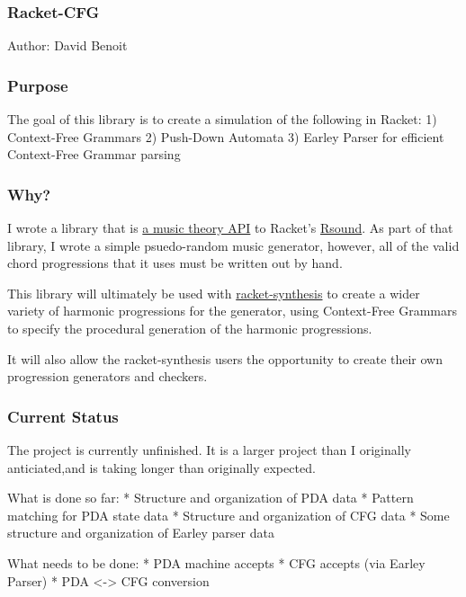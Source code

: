 \subsubsection{Racket-CFG}\label{racket-cfg}

Author: David Benoit

\subsubsection{Purpose}\label{purpose}

The goal of this library is to create a simulation of the following in
Racket: 1) Context-Free Grammars 2) Push-Down Automata 3) Earley Parser
for efficient Context-Free Grammar parsing

\subsubsection{Why?}\label{why}

I wrote a library that is
\href{https://github.com/benoid/racket-synthesis}{a music theory API} to
Racket's \href{https://github.com/jbclements/RSound}{Rsound}. As part of
that library, I wrote a simple psuedo-random music generator, however,
all of the valid chord progressions that it uses must be written out by
hand.

This library will ultimately be used with
\href{https://github.com/benoid/racket-synthesis}{racket-synthesis} to
create a wider variety of harmonic progressions for the generator, using
Context-Free Grammars to specify the procedural generation of the
harmonic progressions.

It will also allow the racket-synthesis users the opportunity to create
their own progression generators and checkers.

\subsubsection{Current Status}\label{current-status}

The project is currently unfinished. It is a larger project than I
originally anticiated,and is taking longer than originally expected.

What is done so far: * Structure and organization of PDA data * Pattern
matching for PDA state data * Structure and organization of CFG data *
Some structure and organization of Earley parser data

What needs to be done: * PDA machine accepts * CFG accepts (via Earley
Parser) * PDA \textless{}-\textgreater{} CFG conversion
